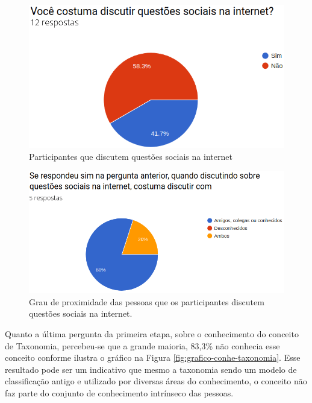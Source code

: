 \begin{figure}[!ht]
    \centering
    \includegraphics[scale=0.4]{./figuras/discutir.png}
    \caption{Participantes que discutem questões sociais na internet}
    \label{fig:grafico-discu}
\end{figure}

\begin{figure}[!ht]
    \centering
    \includegraphics[scale=0.4]{./figuras/discutir_com.png}
    \caption{Grau de proximidade das pessoas que os participantes discutem questões sociais na internet.}
    \label{fig:grafico-discu-alvo}
\end{figure}

\par
Quanto a última pergunta da primeira etapa, sobre o conhecimento do conceito de Taxonomia, percebeu-se que a grande maioria, 83,3\% não conhecia esse conceito conforme ilustra 
o gráfico na Figura \ref{fig:grafico-conhe-taxonomia}. Esse resultado pode ser um indicativo que mesmo a taxonomia sendo um modelo de classificação antigo e utilizado por diversas 
áreas do conhecimento, o conceito não faz parte do conjunto de conhecimento intrínseco das pessoas.

